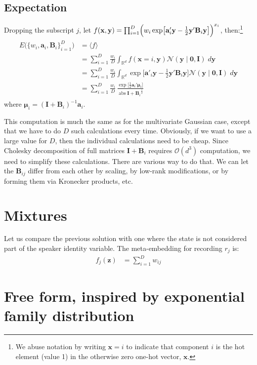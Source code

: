\documentclass[a4paper,oneside,12pt,english]{report}
\def\zvec{\mathbf{z}}
\def\ND{\mathcal{N}}
\DeclareMathOperator{\abs}{abs}
\def\expv#1#2{\bigl\langle#1\bigr\rangle_{#2}}
\def\R{\mathbb{R}}
\def\Bmat{\mathbf{B}}
\def\Imat{\mathbf{I}}
\def\yvec{\mathbf{y}}
\def\xvec{\mathbf{x}}
\def\muvec{\boldsymbol{\mu}}
\def\avec{\mathbf{a}}
\def\nulvec{\boldsymbol{0}}
\begin{document}
\subsection{Expectation}
\def\Oset{\mathcal{O}}
Dropping the subscript $j$, let $f(\xvec,\yvec) = \prod_{i=1}^D \Bigl(w_i\exp\bigl[\avec'_i\yvec-\frac12\yvec'\Bmat_i\yvec\bigr]\Bigr)^{x_i}$, then:\footnote{We abuse notation by writing $\xvec=i$ to indicate that component $i$ is the hot element (value 1) in the otherwise zero one-hot vector, $\xvec$.}
\begin{align}
\begin{split}
E\bigl(\{w_i,\avec_i,\Bmat_i\}_{i=1}^D\bigr) &= \expv{f}{} \\
&= \sum_{i=1}^D \frac{w_i}{D} \int_{\R^d} f(\xvec=i,\yvec) \ND(\yvec\mid\nulvec,\Imat)\;d\yvec  \\
&= \sum_{i=1}^D \frac{w_i}{D} \int_{\R^d} \exp\bigl[\avec'_i\yvec-\frac12\yvec'\Bmat_i\yvec\bigr] \ND(\yvec\mid\nulvec,\Imat)\;d\yvec  \\
&= \sum_{i=1}^D \frac{w_i}{D} \,\frac{\exp\bigl[\frac12\avec_i'\muvec_i\bigr]}{\abs{\Imat+\Bmat_i}^{\frac12}} 
\end{split}
\end{align}
where $\muvec_i=(\Imat+\Bmat_i)^{-1}\avec_i$. 

This computation is much the same as for the multivariate Gaussian case, except that we have to do $D$ such calculations every time. Obviously, if we want to use a large value for $D$, then the individual calculations need to be cheap. Since Cholesky decomposition of full matrices $\Imat+\Bmat_i$ requires $\Oset(d^3)$ computation, we need to simplify these calculations. There are various way to do that. We can let the $\Bmat_{ij}$ differ from each other by scaling, by low-rank modifications, or by forming them via Kronecker products, etc.


\section{Mixtures}
Let us compare the previous solution with one where the state is not considered part of the speaker identity variable. The meta-embedding for recording $r_j$ is:
\begin{align}
f_j(\zvec) &= \sum_{i=1}^D w_{ij} 
\end{align}



\section{Free form, inspired by exponential family distribution}
\end{document}
